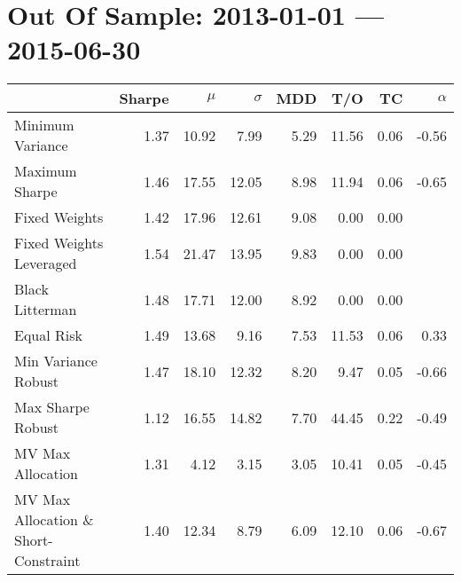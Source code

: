 \documentclass[11pt, parskip=full, DIV=14]{scrreprt}
\begin{document}
\chapter*{Out Of Sample: 2013-01-01 --- 2015-06-30}
\begin{table}[ht]
\centering
\begin{tabular}{lrrrrrrr}
\toprule
                      & Sharpe & $\mu$ &$\sigma$& MDD & T/O & TC & $\alpha$ \\ 
\midrule
Minimum Variance & 1.37 & 10.92 & 7.99 & 5.29 & 11.56 & 0.06 & -0.56 \\ 
  Maximum Sharpe & 1.46 & 17.55 & 12.05 & 8.98 & 11.94 & 0.06 & -0.65 \\ 
  Fixed Weights & 1.42 & 17.96 & 12.61 & 9.08 & 0.00 & 0.00 &  \\ 
  Fixed Weights Leveraged & 1.54 & 21.47 & 13.95 & 9.83 & 0.00 & 0.00 &  \\ 
  Black Litterman & 1.48 & 17.71 & 12.00 & 8.92 & 0.00 & 0.00 &  \\ 
  Equal Risk & 1.49 & 13.68 & 9.16 & 7.53 & 11.53 & 0.06 & 0.33 \\ 
  Min Variance Robust & 1.47 & 18.10 & 12.32 & 8.20 & 9.47 & 0.05 & -0.66 \\ 
  Max Sharpe Robust & 1.12 & 16.55 & 14.82 & 7.70 & 44.45 & 0.22 & -0.49 \\ 
  MV Max Allocation & 1.31 & 4.12 & 3.15 & 3.05 & 10.41 & 0.05 & -0.45 \\ 
  MV Max Allocation \& Short-Constraint & 1.40 & 12.34 & 8.79 & 6.09 & 12.10 & 0.06 & -0.67 \\ 
\bottomrule
\end{tabular}
\end{table}

\end{document}
